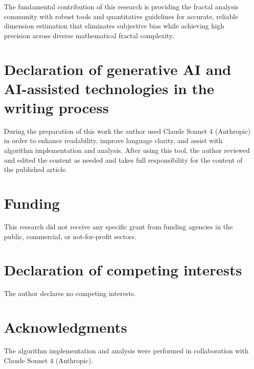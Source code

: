 \documentclass[preprint,12pt]{elsarticle}
\begin{document}
The fundamental contribution of this research is providing the fractal analysis community with robust tools and quantitative guidelines for accurate, reliable dimension estimation that eliminates subjective bias while achieving high precision across diverse mathematical fractal complexity.

\section*{Declaration of generative AI and AI-assisted technologies in the writing process}
During the preparation of this work the author used Claude Sonnet 4 (Anthropic) in order to enhance readability, improve language clarity, and assist with algorithm implementation and analysis. After using this tool, the author reviewed and edited the content as needed and takes full responsibility for the content of the published article.

\section*{Funding}
This research did not receive any specific grant from funding agencies in the public, commercial, or not-for-profit sectors.

\section*{Declaration of competing interests}
The author declares no competing interests.

\section*{Acknowledgments}
The algorithm implementation and analysis were performed in collaboration with Claude Sonnet 4 (Anthropic).

\appendix


\end{document}
